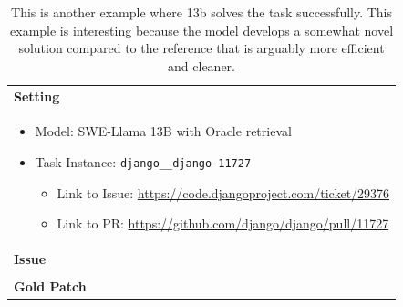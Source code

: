 \begin{table}[ht]
\caption{This is another example where \swellama 13b solves the task successfully.
This example is interesting because the model develops a somewhat novel solution compared to the reference that is arguably more efficient and cleaner.}
\label{table:appx:quality-example3}
\centering
\begin{tabular}{p{\linewidth}}
    \toprule
    \textbf{Setting} \\
    \begin{itemize}[noitemsep,topsep=0pt]
        \item Model: SWE-Llama 13B with Oracle retrieval
        \item Task Instance: \texttt{django\_\_django-11727}
        \begin{itemize}
            \item Link to Issue: \href{https://code.djangoproject.com/ticket/29376}{https://code.djangoproject.com/ticket/29376}
            \item Link to PR: \href{https://github.com/django/django/pull/11727}{https://github.com/django/django/pull/11727}
        \end{itemize}
    \end{itemize} \\
    \midrule
    \textbf{Issue} \\
     \\
    \midrule
    \textbf{Gold Patch}
     \\
    \bottomrule
\end{tabular}
\end{table}

